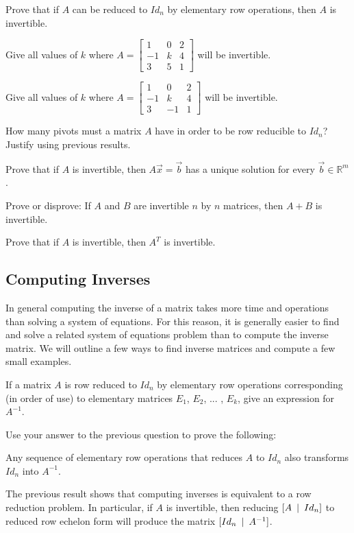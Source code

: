 \bq\label{q11} Prove that if $A$ can be reduced to $Id_n$ by elementary row operations, then $A$ is invertible.
\eq

\bq Give all values of $k$ where $A=\begin{bmatrix} 1&0&2\\-1&k&4\\3&5&1 \end{bmatrix}$ will be invertible.
\eq

\bq Give all values of $k$ where $A=\begin{bmatrix} 1&0&2\\-1&k&4\\3&-1&1 \end{bmatrix}$ will be invertible.
\eq

\bq How many pivots must a matrix $A$ have in order to be row reducible to $Id_n$? Justify using previous results.
\eq

\bq Prove that if $A$ is invertible, then $A\vec{x} =\vec{b}$ has a unique solution for every $\vec{b} \in \mathbb{R}^m$.
\eq

\bq Prove or disprove: If $A$ and $B$ are invertible $n$ by $n$ matrices, then $A+B$ is invertible.
\eq

\bq Prove that if $A$ is invertible, then $A^T$ is invertible.
\eq

\subsection{Computing Inverses}
In general computing the inverse of a matrix takes more time and operations than solving a system of equations. For this reason, it is generally easier to find and solve a related system of equations problem than to compute the inverse matrix. We will outline a few ways to find inverse matrices and compute a few small examples.

\bq If a matrix $A$ is row reduced to $Id_n$ by elementary row operations corresponding (in order of use) to elementary matrices $E_1$, $E_2$, ... , $E_k$, give an expression for $A^{-1}$.
\eq

\bq Use your answer to the previous question to prove the following:

Any sequence of elementary row operations that reduces $A$ to $Id_n$ also transforms $Id_n$ into $A^{-1}$.
\eq

The previous result shows that computing inverses is equivalent to a row reduction problem. In particular, if $A$ is invertible, then reducing $[ A \enskip | \enskip Id_n]$ to reduced row echelon form will produce the matrix $[ Id_n \enskip | \enskip A^{-1}]$.

